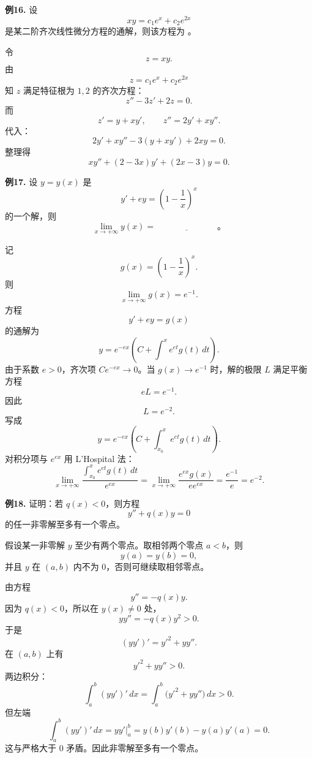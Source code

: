 \begin{problemblock}
\textbf{例16.} 设
\[
xy=c_1e^x+c_2e^{2x}
\]
是某二阶齐次线性微分方程的通解，则该方程为
\underline{\hspace{6cm}}。
\end{problemblock}
\begin{solutionblock}
令
\[
z=xy.
\]
由
\[
z=c_1e^x+c_2e^{2x}
\]
知 \(z\) 满足特征根为 \(1,2\) 的齐次方程：
\[
z''-3z'+2z=0.
\]
而
\[
z'=y+xy',\qquad z''=2y'+xy''.
\]
代入：
\[
2y'+xy''-3(y+xy')+2xy=0.
\]
整理得
\[
xy''+(2-3x)y'+(2x-3)y=0.
\]
\end{solutionblock}

\begin{problemblock}
\textbf{例17.} 设 \(y=y(x)\) 是
\[
y'+ey=\left(1-\frac1x\right)^x
\]
的一个解，则
\[
\lim_{x\to+\infty}y(x)=\underline{\hspace{3cm}}。
\]
\end{problemblock}
\begin{solutionblock}
记
\[
g(x)=\left(1-\frac1x\right)^x.
\]
则
\[
\lim_{x\to+\infty}g(x)=e^{-1}.
\]
方程
\[
y'+ey=g(x)
\]
的通解为
\[
y=e^{-ex}\left(C+\int^x e^{et}g(t)\,dt\right).
\]
由于系数 \(e>0\)，齐次项 \(Ce^{-ex}\to0\)。当 \(g(x)\to e^{-1}\) 时，解的极限 \(L\) 满足平衡方程
\[
eL=e^{-1}.
\]
因此
\[
L=e^{-2}.
\]
写成
\[
y=e^{-ex}\left(C+\int_{x_0}^x e^{et}g(t)\,dt\right).
\]
对积分项与 \(e^{ex}\) 用 L'Hospital 法：
\[
\lim_{x\to+\infty}
\frac{\int_{x_0}^x e^{et}g(t)\,dt}{e^{ex}}
=\lim_{x\to+\infty}\frac{e^{ex}g(x)}{ee^{ex}}
=\frac{e^{-1}}e=e^{-2}.
\]
\end{solutionblock}

\begin{problemblock}
\textbf{例18.} 证明：若 \(q(x)<0\)，则方程
\[
y''+q(x)y=0
\]
的任一非零解至多有一个零点。
\end{problemblock}
\begin{solutionblock}
假设某一非零解 \(y\) 至少有两个零点。取相邻两个零点 \(a<b\)，则
\[
y(a)=y(b)=0,
\]
并且 \(y\) 在 \((a,b)\) 内不为 \(0\)，否则可继续取相邻零点。

由方程
\[
y''=-q(x)y.
\]
因为 \(q(x)<0\)，所以在 \(y(x)\ne0\) 处，
\[
yy''=-q(x)y^2>0.
\]
于是
\[
(yy')'=y'^2+yy''.
\]
在 \((a,b)\) 上有
\[
y'^2+yy''>0.
\]
两边积分：
\[
\int_a^b (yy')'\,dx
=\int_a^b \bigl(y'^2+yy''\bigr)\,dx>0.
\]
但左端
\[
\int_a^b (yy')'\,dx
=\left.yy'\right|_a^b
=y(b)y'(b)-y(a)y'(a)=0.
\]
这与严格大于 \(0\) 矛盾。因此非零解至多有一个零点。
\end{solutionblock}

